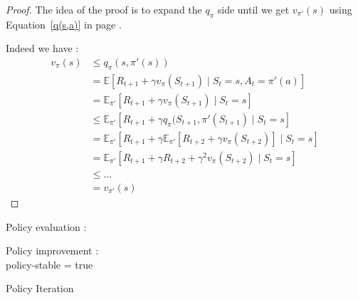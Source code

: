 \documentclass[14pt,a4paper]{article}
\theoremstyle{definition}
\begin{document}
\begin{proof}
The idea of the proof is to expand the $q_{\pi}$ side until we get $v_{\pi'}(s)$ using Equation~\ref{q(s,a)} in page \pageref{q(s,a)}.

Indeed we have : 
\begin{equation}
\begin{split}
v_{\pi}(s) &\leq q_{\pi}(s,\pi'(s))
\\&=\mathbb{E}[R_{t+1}+\gamma v_{\pi}(S_{t+1})\mid S_{t}=s, A_{t}=\pi'(a)]
\\&=\mathbb{E}_{\pi'}[R_{t+1}+\gamma v_{\pi}(S_{t+1})\mid S_{t}=s]
\\& \leq \mathbb{E}_{\pi'}[R_{t+1}+\gamma q_{\pi}(S_{t+1},\pi'(S_{t+1}) \mid S_{t}=s]
\\& = \mathbb{E}_{\pi'}[R_{t+1}+\gamma \mathbb{E}_{\pi'}[R_{t+2}+\gamma v_{\pi}(S_{t+2})]\mid S_{t}=s]
\\& = \mathbb{E}_{\pi'}[R_{t+1}+\gamma R_{t+2}+\gamma^2 v_{\pi}(S_{t+2})\mid S_{t}=s]
\\& \leq \ldots
\\&= v_{\pi'}(s)
\end{split}
\end{equation}
\end{proof}


\begin{algorithm}
    
	
	Policy evaluation :\\
     
     Policy improvement : \\
     policy-stable = true \\
     
	\caption{Policy Iteration}
	\label{algo3}
\end{algorithm}
\end{document}
